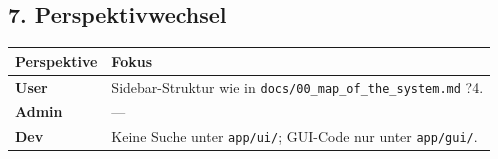 \subsection{7. Perspektivwechsel}

\begin{center}
\begin{tabular}{ll}
\hline
Perspektive & Fokus \\
\hline
\textbf{User} & Sidebar-Struktur wie in \texttt{docs/00\_map\_of\_the\_system.md} ?4. \\
\textbf{Admin} & --- \\
\textbf{Dev} & Keine Suche unter \texttt{app/ui/}; GUI-Code nur unter \texttt{app/gui/}. \\
\hline
\end{tabular}
\end{center}
